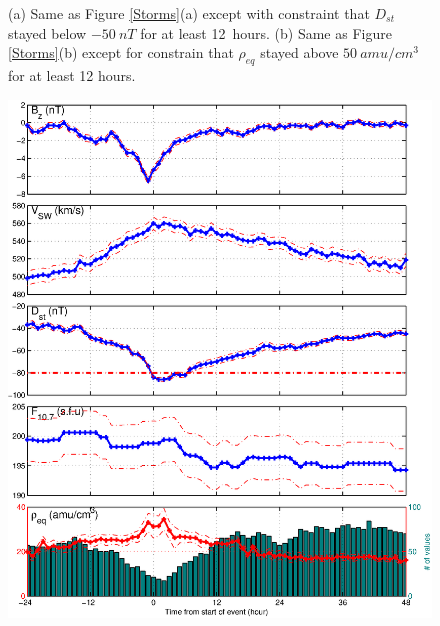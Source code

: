 \documentclass[10pt,twocolumn]{article}
\begin{document}
\begin{figure}[htp!]
\caption{(a) Same as Figure \ref{Storms}(a) except with constraint that $D_{st}$ stayed below $-50~nT$ for at least 12~hours. (b) Same as Figure \ref{Storms}(b) except for constrain that $\rho_{eq}$ stayed above $50~amu/cm^3$ for at least 12 hours.}
\label{Mspec}
\end{figure}

\begin{figure}[htp!]
\centering
\includegraphics[scale=0.45]{paperfigures/stormavs-d80.eps}

\end{figure}
\end{document}

